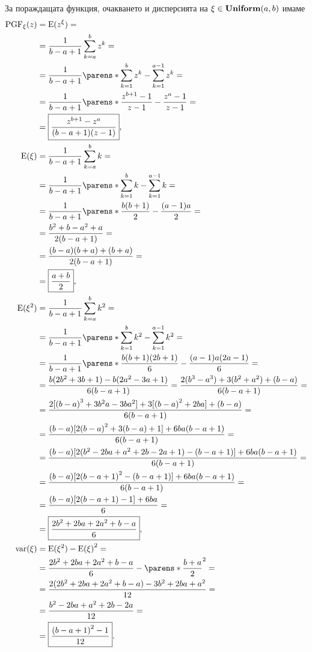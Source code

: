 \documentclass{../../common/topic}
\begin{document}
За пораждащата функция, очакването и дисперсията на \( \xi \in \operatorname{\mathbf{Uniform}}(a, b) \) имаме
\begingroup
\allowdisplaybreaks
\begin{align*}
  \PGF_\xi(z)
  &=
  \Expect(z^\xi)
  = \\ &=
  \frac 1 {b-a+1} \sum_{k=a}^b z^k
  = \\ &=
  \frac 1 {b-a+1} \parens*{ \sum_{k=1}^b z^k - \sum_{k=1}^{a-1} z^k }
  = \\ &=
  \frac 1 {b-a+1} \parens*{\frac {z^{b+1} - 1} {z - 1} - \frac {z^a - 1} {z - 1} }
  = \\ &=
  \boxed{\frac {z^{b+1} - z^a} {(b-a+1)(z-1)}},
  \\
  \Expect(\xi)
  &=
  \frac 1 {b-a+1} \sum_{k=a}^b k
  = \\ &=
  \frac 1 {b-a+1} \parens*{ \sum_{k=1}^b k - \sum_{k=1}^{a-1} k }
  = \\ &=
  \frac 1 {b-a+1} \parens*{ \frac {b(b+1)} 2 - \frac {(a-1)a} 2 }
  = \\ &=
  \frac {b^2 + b - a^2 + a} {2(b-a+1)}
  = \\ &=
  \frac {(b-a)(b+a) + (b+a)} {2(b-a+1)}
  = \\ &=
  \boxed{\frac {a+b} 2},
  \\
  \Expect(\xi^2)
  &=
  \frac 1 {b-a+1} \sum_{k=a}^b k^2
  = \\ &=
  \frac 1 {b-a+1} \parens*{ \sum_{k=1}^b k^2 - \sum_{k=1}^{a-1} k^2 }
  = \\ &=
  \frac 1 {b-a+1} \parens*{ \frac {b(b+1)(2b+1)} 6 - \frac {(a-1)a(2a-1)} 6 }
  = \\ &=
  \frac {b(2b^2 + 3b + 1) - b(2a^2 - 3a + 1)} {6(b-a+1)}
  =
  \frac {2(b^3 - a^3) + 3(b^2 + a^2) + (b-a)} {6(b-a+1)}
  = \\ &=
  \frac {2[{(b-a)}^3 + 3b^2a - 3ba^2] + 3[{(b-a)}^2 + 2ba] + (b-a)} {6(b-a+1)}
  = \\ &=
  \frac {(b-a) [2{(b-a)}^2 + 3(b-a) + 1] + 6ba(b-a+1)} {6(b-a+1)}
  = \\ &=
  \frac {(b-a) [2(b^2 - 2ba + a^2 + 2b - 2a + 1) - (b-a+1)] + 6ba(b-a+1)} {6(b-a+1)}
  = \\ &=
  \frac {(b-a) [2{(b-a+1)}^2 - (b-a+1)] + 6ba(b-a+1)} {6(b-a+1)}
  = \\ &=
  \frac {(b-a) [2(b-a+1)-1] + 6ba} 6
  = \\ &=
  \boxed{\frac {2b^2+2ba+2a^2+b-a} 6},
  \\
  \var(\xi)
  &=
  \Expect(\xi^2) - {\Expect(\xi)}^2
  = \\ &=
  \frac {2b^2+2ba+2a^2+b-a} 6 - {\parens*{ \frac {b+a} 2 }}^2
  = \\ &=
  \frac {2(2b^2+2ba+2a^2+b-a) - 3{b^2+2ba+a^2}} {12}
  = \\ &=
  \frac {b^2-2ba+a^2+2b-2a} {12}
  = \\ &=
  \boxed{\frac {{(b-a+1)}^2-1} {12}}.
\end{align*}
\endgroup
\end{document}
